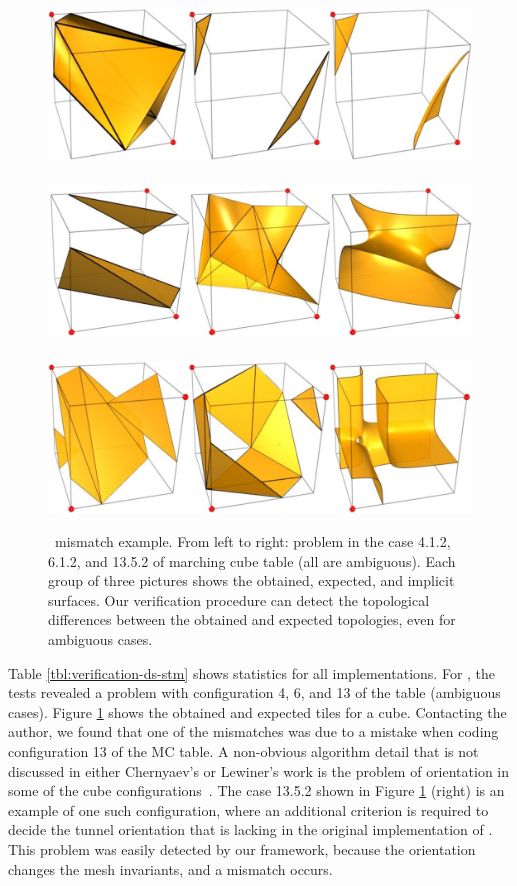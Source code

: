 
\begin{figure}[t]
\centering
\includegraphics[width=0.3\linewidth,keepaspectratio=true]
{chapter3/figures/mc33-case-02.pdf} ~~~~
\includegraphics[width=0.3\linewidth,keepaspectratio=true]
{chapter3/figures/mc33-case-01.pdf} ~~~~
\includegraphics[width=0.3\linewidth,keepaspectratio=true]
{chapter3/figures/mc33-case-00.pdf} 
\caption{\mclewiner\ mismatch example. From left to right: problem in
  the case 4.1.2, 6.1.2, and 13.5.2 of marching cube table (all are
  ambiguous). Each group of three pictures shows the obtained,
  expected, and implicit surfaces. Our verification procedure can
  detect the topological differences between the obtained and expected
  topologies, even for ambiguous cases.}
\label{fig:problem-mclewiner}
\end{figure}

Table \ref{tbl:verification-ds-stm} shows statistics for all 
implementations. For 
\mclewiner, the tests revealed a problem with configuration 4, 6, and 13 of
the table (ambiguous cases). Figure \ref{fig:problem-mclewiner} shows the
obtained and expected tiles for a cube. 
Contacting the author,
we found that one of the mismatches was due
to a mistake when coding configuration 13 of the MC table. A
non-obvious algorithm detail that is not
discussed in either Chernyaev's or Lewiner's work is the problem of orientation in
some of the cube configurations~\cite{Lewiner:2010:PC}. The case 13.5.2 shown in Figure
\ref{fig:problem-mclewiner} (right) is an example of one such configuration, where
an additional criterion is required to decide the tunnel orientation that is
lacking in the original implementation of \mclewiner. This problem was easily
detected by our framework, because the orientation changes the mesh
invariants, and a mismatch occurs.

